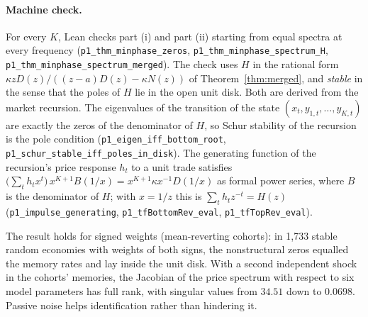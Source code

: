 \documentclass[12pt]{article}
\theoremstyle{definition}
\theoremstyle{remark}
\begin{document}
\paragraph{Machine check.} For every $K$, Lean checks part (i) and part (ii) starting from equal spectra at every frequency (\texttt{p1\_thm\_minphase\_zeros}, \texttt{p1\_thm\_minphase\_spectrum\_H}, \texttt{p1\_thm\_minphase\_spectrum\_merged}). The check uses $H$ in the rational form $\kappa zD(z)/((z-a)D(z)-\kappa N(z))$ of Theorem~\ref{thm:merged}, and \emph{stable} in the sense that the poles of $H$ lie in the open unit disk. Both are derived from the market recursion. The eigenvalues of the transition of the state $(x_t,y_{1,t},\ldots,y_{K,t})$ are exactly the zeros of the denominator of $H$, so Schur stability of the recursion is the pole condition (\texttt{p1\_eigen\_iff\_bottom\_root}, \texttt{p1\_schur\_stable\_iff\_poles\_in\_disk}). The generating function of the recursion's price response $h_t$ to a unit trade satisfies $\bigl(\sum_th_tx^t\bigr)\,x^{K+1}B(1/x)=x^{K+1}\kappa x^{-1}D(1/x)$ as formal power series, where $B$ is the denominator of $H$; with $x=1/z$ this is $\sum_th_tz^{-t}=H(z)$ (\texttt{p1\_impulse\_generating}, \texttt{p1\_tfBottomRev\_eval}, \texttt{p1\_tfTopRev\_eval}).

The result holds for signed weights (mean-reverting cohorts): in 1,733 stable random economies with weights of both signs, the nonstructural zeros equalled the memory rates and lay inside the unit disk. With a second independent shock in the cohorts' memories, the Jacobian of the price spectrum with respect to six model parameters has full rank, with singular values from $34.51$ down to $0.0698$. Passive noise helps identification rather than hindering it.
\end{document}
